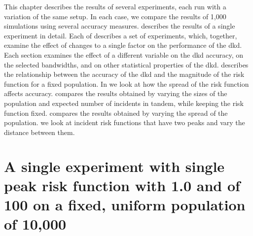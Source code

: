 

\newcommand{\scatterplotcaption}[0]{Small dots are population; triangles are incidents.}%
\newcommand{\errorplotcaption}[0]{%
Triangles and solid lines are using the \glsentryname{oracle} bandwidth. %
Circles and dot-dash lines are \glsentryname{cv} bandwidth. %
Squares and dashed lines are \glsentryname{silverman} bandwidth. %
}%


This chapter describes the results of several experiments, each run with a variation of the same setup.
In each case, we compare the results of 1,000 simulations using several accuracy measures.
 describes the results of a single experiment in detail.
Each of
describes a set of experiments, which, together, examine the effect of changes to a single factor on the performance of the \gls{dkd}.
Each section examines the effect of a different variable on the \gls{dkd} accuracy,
on the selected bandwidths, and on other statistical properties of the \gls{dkd}.
 describes the relationship between the accuracy of the \gls{dkd} and the magnitude of the risk function for a fixed population.
In  we look at how the spread of the risk function affects accuracy.
 compares the results obtained by
varying the sizes of the population and expected number of incidents in tandem,
while keeping the risk function fixed.
 compares the results obtained by varying the spread of the population.
 we look at incident risk functions that have two peaks and vary the distance between them.

\section
    {A single experiment with single peak risk function with  1.0 and  of 100 on a fixed, uniform population of 10,000}
\label{sec:results:unif_100_1.0_1h}

